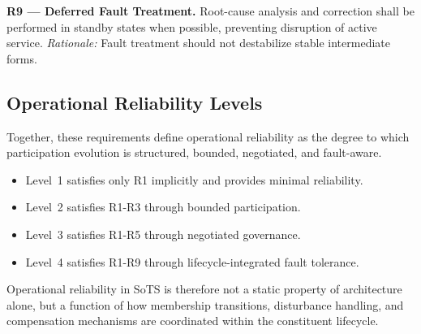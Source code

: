 \textbf{R9 — Deferred Fault Treatment.}  
Root-cause analysis and correction shall be performed in standby states when possible, preventing disruption of active service.  
\emph{Rationale:} Fault treatment should not destabilize stable intermediate forms.

\subsection{Operational Reliability Levels}

Together, these requirements define operational reliability as the degree to which participation evolution is structured, bounded, negotiated, and fault-aware.

\begin{itemize}
    \item Level~1 satisfies only R1 implicitly and provides minimal reliability.
    \item Level~2 satisfies R1-R3 through bounded participation.
    \item Level~3 satisfies R1-R5 through negotiated governance.
    \item Level~4 satisfies R1-R9 through lifecycle-integrated fault tolerance.
\end{itemize}

Operational reliability in SoTS is therefore not a static property of architecture alone, but a function of how membership transitions, disturbance handling, and compensation mechanisms are coordinated within the constituent lifecycle.
